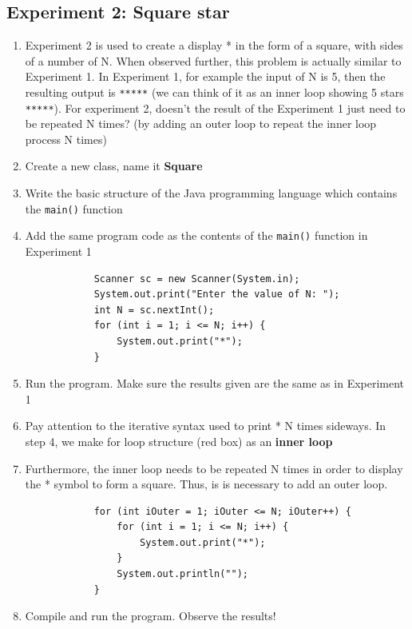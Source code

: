 \documentclass[12pt,titlepage]{article}
\begin{document}
\subsection{Experiment 2: Square star}
\begin{enumerate}
    \item {
        Experiment 2 is used to create a display * in the form of a square, with sides of a number of N.
        When observed further, this problem is actually similar to Experiment 1.
        In Experiment 1, for example the input of N is 5, then the resulting output is \texttt{*****}
        (we can think of it as an inner loop showing 5 stars \texttt{*****}). For experiment 2, doesn't
        the result of the Experiment 1 just need to be repeated N times? (by adding an outer loop to repeat the inner loop process N times)
    }
    \item Create a new class, name it \textbf{Square}
    \item Write the basic structure of the Java programming language which contains the \texttt{main()} function
    \item {
        Add the same program code as the contents of the \texttt{main()} function in Experiment 1

        \begin{verbatim}
            Scanner sc = new Scanner(System.in);
            System.out.print("Enter the value of N: ");
            int N = sc.nextInt();
            for (int i = 1; i <= N; i++) {
                System.out.print("*");
            }
        \end{verbatim}
    }
    \item Run the program. Make sure the results given are the same as in Experiment 1
    \item Pay attention to the iterative syntax used to print * N times sideways. In step 4, we make for loop structure (red box) as an \textbf{inner loop}
    \item {
        Furthermore, the inner loop needs to be repeated N times in order to display the * symbol to form a square. Thus, is is necessary to add an outer loop.

        \begin{verbatim}
            for (int iOuter = 1; iOuter <= N; iOuter++) {
                for (int i = 1; i <= N; i++) {
                    System.out.print("*");
                }
                System.out.println("");
            }
        \end{verbatim}
    }
    \item {
        Compile and run the program. Observe the results!

}
\end{enumerate}
\end{document}
